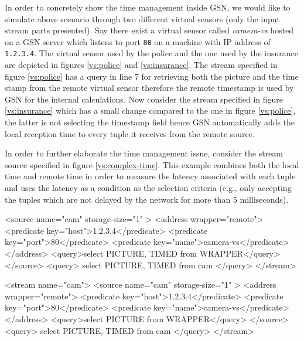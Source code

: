 In order to concretely show the time management inside GSN, we would like to
simulate above scenario through two different virtual sensors (only the input stream parts presented).
Say there exist a virtual sensor called \emph{camera-vs} hosted on a GSN server which listens to port \texttt{80} on a machine with IP address of \texttt{1.2.3.4}.
The virtual sensor used by the police and the one used by the insurance are depicted in figures \ref{vs:police} and \ref{vs:insurance}.
The stream specified in figure \ref{vs:police} has a query in line 7 for retrieving both the picture and the time stamp from the remote virtual sensor therefore
the remote timestamp is used by GSN for the internal calculations. Now consider the stream specified in figure \ref{vs:insurance} which has a small change compared to the one in figure \ref{vs:police}, the latter is not selecting the timestamp field hence GSN automatically adds the local reception time to every tuple it receives from the remote source.

In order to further elaborate the time management issue, consider the stream source specified in figure \ref{vs:complex-time}. This example combines both
the local time and remote time in order to measure the latency associated with each tuple and uses the latency as a condition as the selection
criteria (e.g., only accepting the tuples which are not delayed by the network for more than 5 milliseconds).

\begin{xmlcode}[caption={A stream using the remote timestamp.}, label=vs:police]
   <source name="cam"  storage-size="1" >
      <address wrapper="remote">
         <predicate key="host">1.2.3.4</predicate>
         <predicate key="port">80</predicate>
         <predicate key="name">camera-vs</predicate>
      </address>
      <query>select PICTURE, TIMED from WRAPPER</query>
   </source>
	 <query>
      select PICTURE, TIMED from cam
   </query>
</stream>
\end{xmlcode}

\begin{xmlcode}[caption={A stream using the local (arrival) timestamp.}, label=vs:insurance]
<stream name="cam">
   <source name="cam"  storage-size="1" >
      <address wrapper="remote">
         <predicate key="host">1.2.3.4</predicate>
         <predicate key="port">80</predicate>
         <predicate key="name">camera-vs</predicate>
      </address>
      <query>select PICTURE from WRAPPER</query>
   </source>
   <query>
      select PICTURE, TIMED from cam
   </query>
</stream>
\end{xmlcode}

